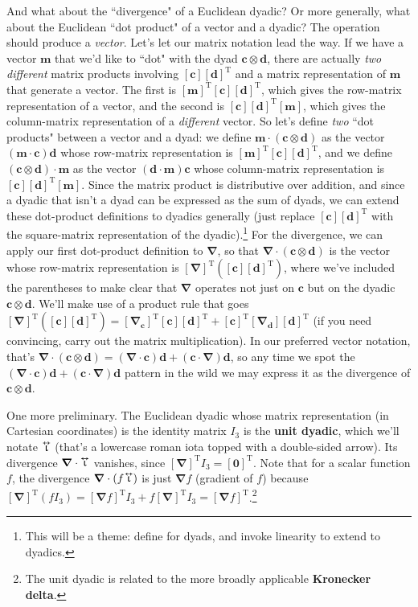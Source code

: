 \documentclass[12pt]{article}
\renewcommand{\vv}[1]{\mathbf{#1}}
\newcommand{\del}{\boldsymbol{\nabla}}
\newcommand{\tightoverset}[2]{%
  \mathop{#2}\limits^{\vbox to -.5ex{\kern-0.75ex\hbox{$#1$}\vss}}}
\newcommand{\inlinedy}[1]{\tightoverset{\text{\tiny$\bm\leftrightarrow$}}{#1}}
\begin{document}
And what about the ``divergence" of a Euclidean dyadic? Or more generally, what about the Euclidean ``dot product" of a vector and a dyadic? The operation should produce a \emph{vector}. Let's let our matrix notation lead the way. If we have a vector $\vv m$ that we'd like to ``dot" with the dyad $\vv c \otimes \vv d$, there are actually \emph{two different} matrix products involving $[\vv c][\vv d]^{\textrm{T}}$ and a matrix representation of $\vv m$ that generate a vector. The first is $[\vv m]^{\mathrm{T}}[\vv c][\vv d]^{\textrm{T}}$, which gives the row-matrix representation of a vector, and the second is $[\vv c][\vv d]^{\textrm{T}}[\vv m]$, which gives the column-matrix representation of a \emph{different} vector. So let's define \emph{two} ``dot products" between a vector and a dyad: we define $\vv m \cdot (\vv c \otimes \vv d)$ as the vector $(\vv m \cdot \vv c) \vv d$ whose row-matrix representation is $[\vv m]^{\mathrm{T}}[\vv c][\vv d]^{\textrm{T}}$, and we define $(\vv c \otimes \vv d) \cdot \vv m$ as the vector $(\vv d \cdot \vv m) \vv c$ whose column-matrix representation is $[\vv c][\vv d]^{\textrm{T}}[\vv m]$. Since the matrix product is distributive over addition, and since a dyadic that isn't a dyad can be expressed as the sum of dyads, we can extend these dot-product definitions to dyadics generally (just replace $[\vv c][\vv d]^{\textrm{T}}$ with the square-matrix representation of the dyadic).\footnote{This will be a theme: define for dyads, and invoke linearity to extend to dyadics.} For the divergence, we can apply our first dot-product definition to $\del$, so that $\del \cdot (\vv c \otimes \vv d)$ is the vector whose row-matrix representation is $[\del]^{\textrm{T}}([\vv c][\vv d]^{\textrm{T}})$, where we've included the parentheses to make clear that $\del$ operates not just on $\vv c$ but on the dyadic $\vv c \otimes \vv d$. We'll make use of a product rule that goes $[\del]^{\textrm{T}}([\vv c][\vv d]^{\textrm{T}}) = [\del_{\vv c}]^{\textrm{T}}[\vv c][\vv d]^{\textrm{T}} + [\vv c]^{\textrm{T}}[\del_{\vv d}][\vv d]^{\textrm{T}}$ (if you need convincing, carry out the matrix multiplication). In our preferred vector notation, that's $\del \cdot (\vv c \otimes \vv d) = (\del \cdot \vv c) \vv d + (\vv c \cdot \del) \vv d$, so any time we spot the $(\del \cdot \vv c) \vv d + (\vv c \cdot \del) \vv d$ pattern in the wild we may express it as the divergence of $\vv c \otimes \vv d$.

One more preliminary. The Euclidean dyadic whose matrix representation (in Cartesian coordinates) is the identity matrix $I_3$ is the \textbf{unit dyadic}, which we'll notate $\inlinedy{\upiota}$ (that's a lowercase roman iota topped with a double-sided arrow). Its divergence $\del \cdot \inlinedy{\upiota}$ vanishes, since $[\del]^{\textrm{T}}I_3 = [\vv 0]^{\textrm{T}}$. Note that for a scalar function $f$, the divergence $\del \cdot (f \mkern-2mu \inlinedy{\upiota})$ is just $\del f$ (gradient of $f$) because $[\del]^{\textrm{T}}(f I_3) = [\del f]^{\textrm{T}} I_3 + f [\del]^{\textrm{T}} I_3 = [\del f]^{\textrm{T}}$.\footnote{The unit dyadic is related to the more broadly applicable \textbf{Kronecker delta}.}
\end{document}
